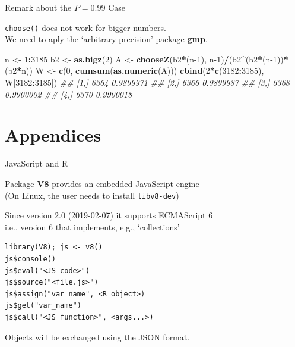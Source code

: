 \documentclass[ignorenonframetext,]{beamer}
\newenvironment{Shaded}{\begin{snugshade}}{\end{snugshade}}
\newcommand{\CommentTok}[1]{\textcolor[rgb]{0.56,0.35,0.01}{\textit{#1}}}
\newcommand{\DecValTok}[1]{\textcolor[rgb]{0.00,0.00,0.81}{#1}}
\newcommand{\KeywordTok}[1]{\textcolor[rgb]{0.13,0.29,0.53}{\textbf{#1}}}
\newcommand{\NormalTok}[1]{#1}
\newcommand{\OperatorTok}[1]{\textcolor[rgb]{0.81,0.36,0.00}{\textbf{#1}}}
\newcommand{\StringTok}[1]{\textcolor[rgb]{0.31,0.60,0.02}{#1}}
\begin{document}
\begin{frame}[fragile]{Remark about the \(P = 0.99\) Case}
\protect\hypertarget{remark-about-the-p-0.99-case}{}

\texttt{choose()} does not work for bigger numbers.\\
We need to aply the `arbitrary-precision' package \textbf{gmp}.

\begin{Shaded}
\begin{Highlighting}[]
\NormalTok{n <-}\StringTok{ }\DecValTok{1}\OperatorTok{:}\DecValTok{3185}
\NormalTok{b2 <-}\StringTok{ }\KeywordTok{as.bigz}\NormalTok{(}\DecValTok{2}\NormalTok{)}
\NormalTok{A <-}\StringTok{ }\KeywordTok{chooseZ}\NormalTok{(b2}\OperatorTok{*}\NormalTok{(n}\DecValTok{-1}\NormalTok{), n}\DecValTok{-1}\NormalTok{)}\OperatorTok{/}\NormalTok{(b2}\OperatorTok{^}\NormalTok{(b2}\OperatorTok{*}\NormalTok{(n}\DecValTok{-1}\NormalTok{))}\OperatorTok{*}\NormalTok{(b2}\OperatorTok{*}\NormalTok{n))}
\NormalTok{W <-}\StringTok{ }\KeywordTok{c}\NormalTok{(}\DecValTok{0}\NormalTok{, }\KeywordTok{cumsum}\NormalTok{(}\KeywordTok{as.numeric}\NormalTok{(A)))}
\KeywordTok{cbind}\NormalTok{(}\DecValTok{2}\OperatorTok{*}\KeywordTok{c}\NormalTok{(}\DecValTok{3182}\OperatorTok{:}\DecValTok{3185}\NormalTok{), W[}\DecValTok{3182}\OperatorTok{:}\DecValTok{3185}\NormalTok{])}
\CommentTok{## [1,] 6364 0.9899971}
\CommentTok{## [2,] 6366 0.9899987}
\CommentTok{## [3,] 6368 0.9900002}
\CommentTok{## [4,] 6370 0.9900018}
\end{Highlighting}
\end{Shaded}

\end{frame}

\hypertarget{appendices}{%
\section{Appendices}\label{appendices}}

\begin{frame}[fragile]{JavaScript and R}
\protect\hypertarget{javascript-and-r}{}

Package \textbf{V8} provides an embedded JavaScript engine\\
(On Linux, the user needs to install \texttt{libv8-dev})

Since version 2.0 (2019-02-07) it supports ECMAScript 6\\
i.e., version 6 that implements, e.g., `collections'

\begin{verbatim}
library(V8); js <- v8()
js$console()
js$eval("<JS code>")
js$source("<file.js>")
js$assign("var_name", <R object>)
js$get("var_name")
js$call("<JS function>", <args...>)
\end{verbatim}

Objects will be exchanged using the JSON format.

\end{frame}
\end{document}
